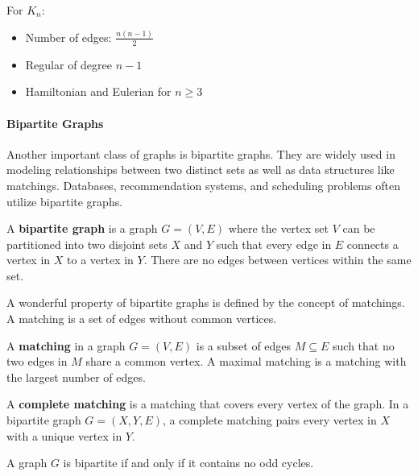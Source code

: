 \documentclass[oneside]{book}
\begin{document}
\begin{theorem}
For $K_n$:
\begin{itemize}
    \item Number of edges: $\frac{n(n-1)}{2}$
    \item Regular of degree $n-1$
    \item Hamiltonian and Eulerian for $n \geq 3$
\end{itemize}
\end{theorem}

\paragraph{Bipartite Graphs}
Another important class of graphs is bipartite graphs. They are widely used in modeling relationships between two distinct sets as well as data structures like matchings. Databases, recommendation systems, and scheduling problems often utilize bipartite graphs.

\begin{definition}
A \textbf{bipartite graph} is a graph $G = (V, E)$ where the vertex set $V$ can be partitioned into two disjoint sets $X$ and $Y$ such that every edge in $E$ connects a vertex in $X$ to a vertex in $Y$. There are no edges between vertices within the same set.
\end{definition}

A wonderful property of bipartite graphs is defined by the concept of matchings. A matching is a set of edges without common vertices.

\begin{definition}
A \textbf{matching} in a graph $G = (V, E)$ is a subset of edges $M \subseteq E$ such that no two edges in $M$ share a common vertex. A maximal matching is a matching with the largest number of edges.
\end{definition}

\begin{definition}
A \textbf{complete matching} is a matching that covers every vertex of the graph. In a bipartite graph $G = (X, Y, E)$, a complete matching pairs every vertex in $X$ with a unique vertex in $Y$.
\end{definition}

\begin{theorem}
A graph $G$ is bipartite if and only if it contains no odd cycles.
\end{theorem}
\end{document}
